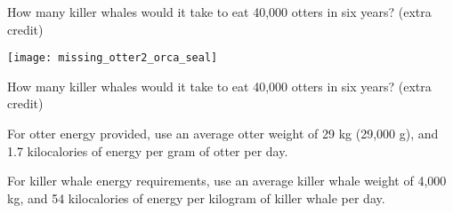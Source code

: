 \documentclass[t]{beamer}
\begin{document}
%
\begin{frame}[t]{How many killer whales would it take to eat 40,000 otters in six years? (extra credit)}

	\texttt{[image: missing\_otter2\_orca\_seal]}

\end{frame}
%
\begin{frame}[t]{How many killer whales would it take to eat 40,000 otters in six years? (extra credit)}

	\hangpara For otter energy provided, use \newline	
	\hspace*{1em} an average otter weight of 29 kg (29,000 g), and \newline
	\hspace*{1em} 1.7 kilocalories of energy per gram of otter per day.

	\hangpara For killer whale energy requirements, use \newline
	\hspace*{1em} an average killer whale weight of 4,000 kg, and \newline
	\hspace*{1em} 54 kilocalories of energy per kilogram of killer whale per day.

\end{frame}
%
\end{document}
